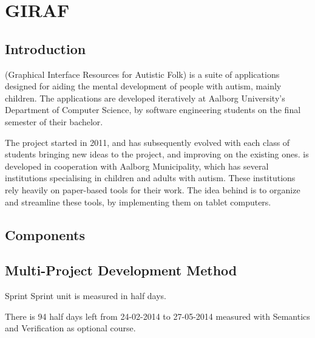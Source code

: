 \chapter{GIRAF}\label{chap:giraf}

\section{Introduction}\label{sec:giraf:introduction}
\giraf (Graphical Interface Resources for Autistic Folk) is a suite of applications designed for aiding the mental development of people with autism, mainly children. The applications are developed iteratively at Aalborg University's Department of Computer Science, by software engineering students on the final semester of their bachelor.

The project started in 2011, and has subsequently evolved with each class of students bringing new ideas to the project, and improving on the existing ones.
\giraf is developed in cooperation with Aalborg Municipality, which has several institutions specialising in children and adults with autism. 
These institutions rely heavily on paper-based tools for their work. 
The idea behind \giraf is to organize and streamline these tools, by implementing them on tablet computers.

\section{\giraf Components}\label{sec:giraf:components}

\section{Multi-Project Development Method}\label{sec:giraf:development}




Sprint
Sprint unit is measured in half days.

There is 94 half days left from 24-02-2014 to 27-05-2014 measured with Semantics and Verification as optional course.

